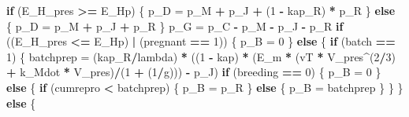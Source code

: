 \documentclass[]{article}
\newenvironment{Shaded}{\begin{snugshade}}{\end{snugshade}}
\newcommand{\DecValTok}[1]{\textcolor[rgb]{0.00,0.00,0.81}{#1}}
\newcommand{\StringTok}[1]{\textcolor[rgb]{0.31,0.60,0.02}{#1}}
\newcommand{\ControlFlowTok}[1]{\textcolor[rgb]{0.13,0.29,0.53}{\textbf{#1}}}
\newcommand{\OperatorTok}[1]{\textcolor[rgb]{0.81,0.36,0.00}{\textbf{#1}}}
\newcommand{\NormalTok}[1]{#1}
\begin{document}
\begin{Shaded}
\begin{Highlighting}[]
{{{    \ControlFlowTok{if}\NormalTok{ (E_H_pres }\OperatorTok{>=}\StringTok{ }\NormalTok{E_Hp) \{}
\NormalTok{        p_D =}\StringTok{ }\NormalTok{p_M }\OperatorTok{+}\StringTok{ }\NormalTok{p_J }\OperatorTok{+}\StringTok{ }\NormalTok{(}\DecValTok{1} \OperatorTok{-}\StringTok{ }\NormalTok{kap_R) }\OperatorTok{*}\StringTok{ }\NormalTok{p_R}
\NormalTok{    \}}
    \ControlFlowTok{else}\NormalTok{ \{}
\NormalTok{        p_D =}\StringTok{ }\NormalTok{p_M }\OperatorTok{+}\StringTok{ }\NormalTok{p_J }\OperatorTok{+}\StringTok{ }\NormalTok{p_R}
\NormalTok{    \}}
\NormalTok{    p_G =}\StringTok{ }\NormalTok{p_C }\OperatorTok{-}\StringTok{ }\NormalTok{p_M }\OperatorTok{-}\StringTok{ }\NormalTok{p_J }\OperatorTok{-}\StringTok{ }\NormalTok{p_R}
    \ControlFlowTok{if}\NormalTok{ ((E_H_pres }\OperatorTok{<=}\StringTok{ }\NormalTok{E_Hp) }\OperatorTok{|}\StringTok{ }\NormalTok{(pregnant }\OperatorTok{==}\StringTok{ }\DecValTok{1}\NormalTok{)) \{}
\NormalTok{        p_B =}\StringTok{ }\DecValTok{0}
\NormalTok{    \}}
    \ControlFlowTok{else}\NormalTok{ \{}
        \ControlFlowTok{if}\NormalTok{ (batch }\OperatorTok{==}\StringTok{ }\DecValTok{1}\NormalTok{) \{}
\NormalTok{            batchprep =}\StringTok{ }\NormalTok{(kap_R}\OperatorTok{/}\NormalTok{lambda) }\OperatorTok{*}\StringTok{ }\NormalTok{((}\DecValTok{1} \OperatorTok{-}\StringTok{ }\NormalTok{kap) }\OperatorTok{*}\StringTok{ }\NormalTok{(E_m }\OperatorTok{*}\StringTok{ }
\StringTok{                }\NormalTok{(vT }\OperatorTok{*}\StringTok{ }\NormalTok{V_pres}\OperatorTok{^}\NormalTok{(}\DecValTok{2}\OperatorTok{/}\DecValTok{3}\NormalTok{) }\OperatorTok{+}\StringTok{ }\NormalTok{k_Mdot }\OperatorTok{*}\StringTok{ }\NormalTok{V_pres)}\OperatorTok{/}\NormalTok{(}\DecValTok{1} \OperatorTok{+}\StringTok{ }\NormalTok{(}\DecValTok{1}\OperatorTok{/}\NormalTok{g))) }\OperatorTok{-}\StringTok{ }
\StringTok{                }\NormalTok{p_J)}
            \ControlFlowTok{if}\NormalTok{ (breeding }\OperatorTok{==}\StringTok{ }\DecValTok{0}\NormalTok{) \{}
\NormalTok{                p_B =}\StringTok{ }\DecValTok{0}
\NormalTok{            \}}
            \ControlFlowTok{else}\NormalTok{ \{}
                \ControlFlowTok{if}\NormalTok{ (cumrepro }\OperatorTok{<}\StringTok{ }\NormalTok{batchprep) \{}
\NormalTok{                  p_B =}\StringTok{ }\NormalTok{p_R}
\NormalTok{                \}}
                \ControlFlowTok{else}\NormalTok{ \{}
\NormalTok{                  p_B =}\StringTok{ }\NormalTok{batchprep}
\NormalTok{                \}}
\NormalTok{            \}}
\NormalTok{        \}}
        \ControlFlowTok{else}\NormalTok{ \{}
}}}
\end{Highlighting}
\end{Shaded}
\end{document}
